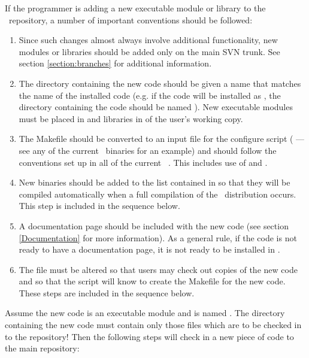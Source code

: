 If the programmer is adding a new executable module or library to the
\PSIthree\ repository, a number of important conventions should be followed:

\begin{enumerate}
\item Since such changes almost always involve additional functionality,
new modules or libraries should be added only on the main SVN trunk.
See section \ref{section:branches} for additional information.

\item The directory containing the new code should be given a name
  that matches the name of the installed code (e.g. if the code will
  be installed as , the directory containing the code
  should be named ). New executable modules must be
  placed in  and libraries in
   of the user's working copy.

\item The Makefile should be converted to an input file for the
  configure script ( --- see any of the current
  \PSIthree\ binaries for an example) and should follow the
  conventions set up in all of the current \PSIthree\
  . This includes use of  and
  .

\item New binaries should be added to the list contained in
   so that they will be
  compiled automatically when a full compilation of the \PSIthree\
  distribution occurs. This step is included in the sequence below.

\item A documentation page should be included with the new code (see
  section \ref{Documentation} for more information). As a general
  rule, if the code is not ready to have a documentation page, it is
  not ready to be installed in \PSIthree.

\item The  file must be altered so that users may
  check out copies of the new code and so that the 
  script will know to create the Makefile for the new code. These
  steps are included in the sequence below.

\end{enumerate}

Assume the new code is an executable module and is named
. The directory containing the new code must
contain only those files which are to be checked in to the repository!
Then the following steps will check in a new piece of code to the main
repository:


